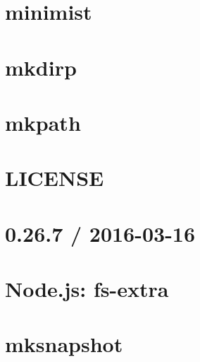 \documentclass[twoside]{book}
\newcommand{\+}{\discretionary{\mbox{\scriptsize$\hookleftarrow$}}{}{}}
\begin{document}
\chapter{minimist}
\label{md_dsmacc_vis_degree_node_modules_mkdirp_node_modules_minimist_readme}

\chapter{mkdirp}
\label{md_dsmacc_vis_degree_node_modules_mkdirp_readme}

\chapter{mkpath}
\label{md_dsmacc_vis_degree_node_modules_mkpath_README}

\chapter{L\+I\+C\+E\+N\+SE}
\label{md_dsmacc_vis_degree_node_modules_mksnapshot_LICENSE}

\chapter{0.26.7 / 2016-\/03-\/16}
\label{md_dsmacc_vis_degree_node_modules_mksnapshot_node_modules_fs-extra_CHANGELOG}

\chapter{Node.\+js\+: fs-\/extra}
\label{md_dsmacc_vis_degree_node_modules_mksnapshot_node_modules_fs-extra_README}

\chapter{mksnapshot}
\label{md_dsmacc_vis_degree_node_modules_mksnapshot_README}

\end{document}
